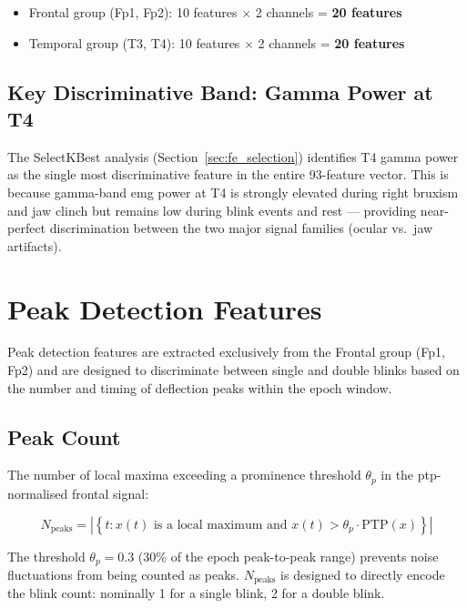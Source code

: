 \begin{itemize}[leftmargin=*]
    \item Frontal group (Fp1, Fp2): 10 features
    $\times$ 2 channels = \textbf{20 features}
    \item Temporal group (T3, T4): 10 features
    $\times$ 2 channels = \textbf{20 features}
\end{itemize}

\subsection{Key Discriminative Band: Gamma Power at T4}

The SelectKBest analysis (Section~\ref{sec:fe_selection})
identifies T4 gamma power as the single most discriminative
feature in the entire 93-feature vector. This is because
gamma-band \acrshort{emg} power at T4 is strongly elevated
during right bruxism and jaw clinch but remains low during
blink events and rest — providing near-perfect discrimination
between the two major signal families (ocular vs.\ jaw
artifacts).

\section{Peak Detection Features}
\label{sec:fe_peak}

Peak detection features are extracted exclusively from the
Frontal group (Fp1, Fp2) and are designed to discriminate
between single and double blinks based on the number and
timing of deflection peaks within the epoch window.

\subsection{Peak Count}

The number of local maxima exceeding a prominence threshold
$\theta_p$ in the \acrshort{ptp}-normalised frontal signal:

\begin{equation}
N_{\text{peaks}} = \left|\left\{t : x(t) \text{ is a local
maximum and } x(t) > \theta_p \cdot \text{PTP}(x)\right\}\right|
\label{eq:peak_count}
\end{equation}

The threshold $\theta_p = 0.3$ (30\% of the epoch
peak-to-peak range) prevents noise fluctuations from being
counted as peaks. $N_{\text{peaks}}$ is designed to directly
encode the blink count: nominally 1 for a single blink, 2 for
a double blink.

